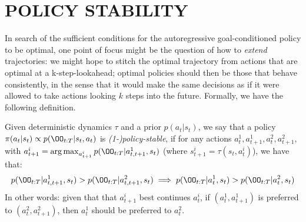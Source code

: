 \section{POLICY STABILITY}

In search of the sufficient conditions for the autoregressive goal-conditioned policy to be optimal, one point of focus might be the question of how to \emph{extend} trajectories: we might hope to stitch the optimal trajectory from actions that are optimal at a k-step-lookahead; optimal policies should then be those that behave consistently, in the sense that it would make the same decisions as if it were allowed to take actions looking $k$ steps into the future. Formally, we have the following definition.

\begin{definition}
    Given deterministic dynamics $\tau$ and a prior $p(a_t|s_t)$, we say that a policy $\pi(a_t|s_t) \propto p(\OO_{t:T}|s_t, a_t)$ is \emph{(1-)policy-stable}, if for any actions $a^1_t, a^1_{t+1}, a^2_t, a^2_{t+1}$, with $a^i_{t+1} = \arg\max_{a^i_{t+1}} p(\OO_{t:T}|a^1_{t, t+1}, s_t)$ (where $s^i_{t+1} = \tau(s_t, a^i_t)$), we have that:
    \[
        p(\OO_{t:T}|a^1_{t, t+1}, s_t) > p(\OO_{t:T}|a^2_{t, t+1}, s_t) \implies  
        p(\OO_{t:T}|a^1_{t}, s_t) > p(\OO_{t:T}|a^2_{t}, s_t)
    \]
    In other words: given that that $a^i_{t+1}$  best continues $a^i_t$, if $(a^1_t, a^1_{t+1})$ is preferred to $(a^2_t, a^2_{t+1})$, then $a^1_t$ should be preferred to $a^2_t$.

\end{definition}

